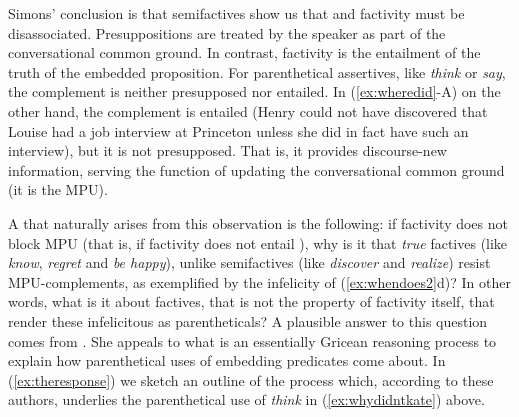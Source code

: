 \documentclass[output=paper]{langsci/langscibook}
\begin{document}
Simons' conclusion %
is that semifactives show us that  and factivity must be disassociated. Presuppositions are treated by the speaker as part of the conversational common ground. In contrast, factivity is the entailment of the truth of the embedded proposition. For parenthetical assertives, like \textit{think} or \textit{say}, the complement is neither presupposed nor entailed.  In (\ref{ex:wheredid}-A) on the other hand, the complement is entailed (Henry could not have discovered that Louise had a job interview at Princeton unless she did in fact have such an interview), but it is not presupposed. That is, it provides discourse-new information, serving the function of updating the conversational common ground (it is the MPU).

A  that naturally arises from this observation is the following: if factivity does not block MPU (that is, if factivity does not entail ), why is it that \textit{true} factives (like \textit{know}, \textit{regret} and \textit{be happy}), unlike semifactives (like \textit{discover} and \textit{realize}) resist MPU-complements, as exemplified by the infelicity of (\ref{ex:whendoes2}d)? In other words, what is it about factives, that is not the property of factivity itself, that render these infelicitous as parentheticals? A plausible answer to this {question} comes from \citet{Simons2007}. She appeals to what is an essentially Gricean reasoning process to explain how parenthetical uses of embedding predicates come about. In (\ref{ex:theresponse}) we sketch an outline of the  process which, according to these authors, underlies the parenthetical use of \textit{think} in (\ref{ex:whydidntkate}) above.
\end{document}
